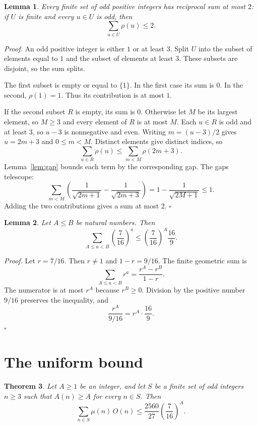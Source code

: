 \documentclass[11pt,letterpaper]{article}
\newtheorem{theorem}{Theorem}
\newtheorem{lemma}[theorem]{Lemma}
\newenvironment{proof}{\noindent\textit{Proof.}}{\hfill\(\square\)}
\begin{document}
\begin{lemma}
\label{lem:recip}
Every finite set of odd positive integers has reciprocal sum at most \(2\): if \(U\) is finite and every \(u\in U\) is odd, then
\[
\sum_{u\in U}\rho(u)\le 2.
\]
\end{lemma}

\begin{proof}
An odd positive integer is either \(1\) or at least \(3\). Split \(U\) into the subset of elements equal to \(1\) and the subset of elements at least \(3\). These subsets are disjoint, so the sum splits.

The first subset is empty or equal to \(\{1\}\). In the first case its sum is \(0\). In the second, \(\rho(1)=1\). Thus its contribution is at most \(1\).

If the second subset \(R\) is empty, its sum is \(0\). Otherwise let \(M\) be its largest element, so \(M\ge 3\) and every element of \(R\) is at most \(M\). Each \(u\in R\) is odd and at least \(3\), so \(u-3\) is nonnegative and even. Writing \(m=(u-3)/2\) gives \(u=2m+3\) and \(0\le m<M\). Distinct elements give distinct indices, so
\[
\sum_{u\in R}\rho(u)
\le\sum_{m<M}\rho(2m+3).
\]
Lemma~\ref{lem:gap} bounds each term by the corresponding gap. The gaps telescope:
\[
\sum_{m<M}\left(\frac{1}{\sqrt{2m+1}}-\frac{1}{\sqrt{2m+3}}\right)
=1-\frac{1}{\sqrt{2M+1}}\le 1.
\]
Adding the two contributions gives a sum at most \(2\).
\end{proof}

\begin{lemma}
\label{lem:tail}
Let \(A\le B\) be natural numbers. Then
\[
\sum_{A\le a<B}\left(\frac{7}{16}\right)^{a}
\le\left(\frac{7}{16}\right)^{A}\frac{16}{9}.
\]
\end{lemma}

\begin{proof}
Let \(r=7/16\). Then \(r\neq 1\) and \(1-r=9/16\). The finite geometric sum is
\[
\sum_{A\le a<B}r^{a}=\frac{r^{A}-r^{B}}{1-r}.
\]
The numerator is at most \(r^{A}\) because \(r^{B}\ge 0\). Division by the positive number \(9/16\) preserves the inequality, and
\[
\frac{r^{A}}{9/16}=r^{A}\cdot\frac{16}{9}.
\]
\end{proof}

\section{The uniform bound}

\begin{theorem}
\label{thm:main}
Let \(A\ge 1\) be an integer, and let \(S\) be a finite set of odd integers \(n\ge 3\) such that \(A(n)\ge A\) for every \(n\in S\). Then
\[
\sum_{n\in S}\mu(n)\,O(n)
\le\frac{2560}{27}\left(\frac{7}{16}\right)^{A}.
\]
\end{theorem}
\end{document}
